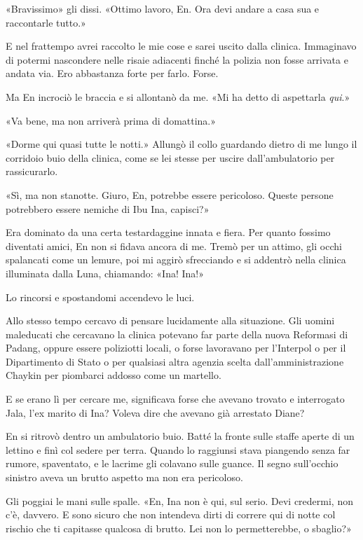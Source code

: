 «Bravissimo» gli dissi. «Ottimo lavoro, En. Ora devi andare a casa sua e
raccontarle tutto.»

E nel frattempo avrei raccolto le mie cose e sarei uscito dalla clinica.
Immaginavo di potermi nascondere nelle risaie adiacenti finché la
polizia non fosse arrivata e andata via. Ero abbastanza forte per farlo.
Forse.

Ma En incrociò le braccia e si allontanò da me. «Mi ha detto di
aspettarla \emph{qui}.»

«Va bene, ma non arriverà prima di domattina.»

«Dorme qui quasi tutte le notti.» Allungò il collo guardando dietro di
me lungo il corridoio buio della clinica, come se lei stesse per uscire
dall'ambulatorio per rassicurarlo.

«Sì, ma non stanotte. Giuro, En, potrebbe essere pericoloso. Queste
persone potrebbero essere nemiche di Ibu Ina, capisci?»

Era dominato da una certa testardaggine innata e fiera. Per quanto
fossimo diventati amici, En non si fidava ancora di me. Tremò per un
attimo, gli occhi spalancati come un lemure, poi mi aggirò sfrecciando e
si addentrò nella clinica illuminata dalla Luna, chiamando: «Ina! Ina!»

Lo rincorsi e spostandomi accendevo le luci.

Allo stesso tempo cercavo di pensare lucidamente alla situazione. Gli
uomini maleducati che cercavano la clinica potevano far parte della
nuova Reformasi di Padang, oppure essere poliziotti locali, o forse
lavoravano per l'Interpol o per il Dipartimento di Stato o per qualsiasi
altra agenzia scelta dall'amministrazione Chaykin per piombarci addosso
come un martello.

E se erano lì per cercare me, significava forse che avevano trovato e
interrogato Jala, l'ex marito di Ina? Voleva dire che avevano già
arrestato Diane?

En si ritrovò dentro un ambulatorio buio. Batté la fronte sulle staffe
aperte di un lettino e finì col sedere per terra. Quando lo raggiunsi
stava piangendo senza far rumore, spaventato, e le lacrime gli colavano
sulle guance. Il segno sull'occhio sinistro aveva un brutto aspetto ma
non era pericoloso.

Gli poggiai le mani sulle spalle. «En, Ina non è qui, sul serio. Devi
credermi, non c'è, davvero. E sono sicuro che non intendeva dirti di
correre qui di notte col rischio che ti capitasse qualcosa di brutto.
Lei non lo permetterebbe, o sbaglio?»

